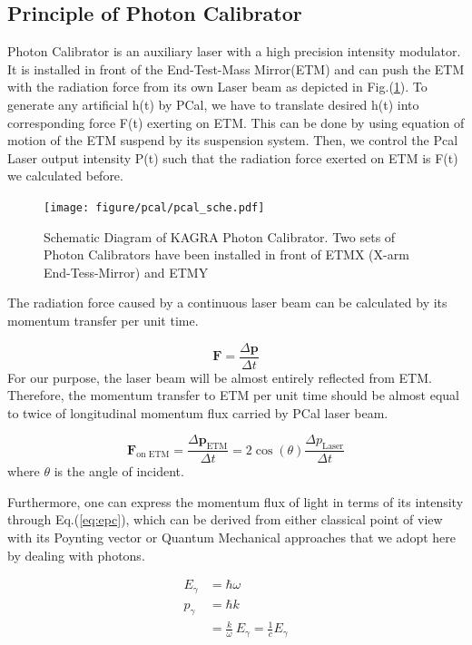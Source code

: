 \subsection{Principle of Photon Calibrator}
\label{sec:pcalth}
Photon Calibrator is an auxiliary laser with a high precision intensity modulator. It is installed in front of the End-Test-Mass Mirror(ETM) and can push the ETM with the radiation force from its own Laser beam as depicted in Fig.(\ref{fig:pcal_sche}). To generate any artificial h(t) by PCal, we have to translate desired h(t) into corresponding force F(t) exerting on ETM. This can be done by using equation of motion of the ETM suspend by its suspension system. Then, we control the Pcal Laser output intensity P(t) such that the radiation force exerted on ETM is F(t) we calculated before. 

\begin{figure}[bt]
\centering
\texttt{[image: figure/pcal/pcal\_sche.pdf]}
\caption[Schematic Diagram of KAGRA Photon Calibrator]{Schematic Diagram of KAGRA Photon Calibrator. Two sets of Photon Calibrators have been installed in front of ETMX (X-arm End-Tess-Mirror) and ETMY  }
\label{fig:pcal_sche}
\end{figure}

The radiation force caused by a continuous laser beam can be calculated by its momentum transfer per unit time.

\begin{equation}
    \mathbf{F} = \frac{\Delta \mathbf{p}}{\Delta t}
\end{equation}
For our purpose, the laser beam will be almost entirely reflected from ETM. Therefore, the momentum transfer to ETM per unit time should be almost equal to twice of longitudinal momentum flux carried by PCal laser beam.

\begin{equation}
\label{eq:f2cos}
    \mathbf{F}_\text{on ETM} = \frac{\Delta \mathbf{p}_\text{ETM}}{\Delta t}
    = 2 \cos(\theta) \frac{\Delta p_\text{Laser} }{\Delta t}
\end{equation}
where $\theta$ is the angle of incident.

Furthermore, one can express the momentum flux of light in terms of its intensity through Eq.(\ref{eq:epc}), which can be derived from either classical point of view with its Poynting vector or Quantum Mechanical approaches that we adopt here by dealing with photons. 

\begin{align}
   E_{\gamma} &= \hbar \omega \\
   p_{\gamma} &= \hbar k \\
              &= \frac{k}{\omega} ~ E_{\gamma} = \frac{1}{c}E_{\gamma}
\end{align}

